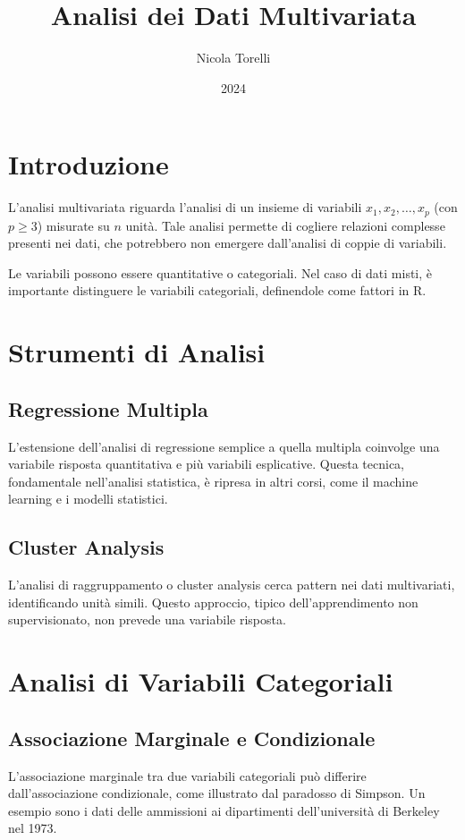 \documentclass{article}
\title{Analisi dei Dati Multivariata}
\author{Nicola Torelli}
\date{2024}
\begin{document}
\maketitle

\section{Introduzione}
L'analisi multivariata riguarda l'analisi di un insieme di variabili \( x_1, x_2, \ldots, x_p \) (con \( p \geq 3 \)) misurate su \( n \) unità. Tale analisi permette di cogliere relazioni complesse presenti nei dati, che potrebbero non emergere dall'analisi di coppie di variabili.

Le variabili possono essere quantitative o categoriali. Nel caso di dati misti, è importante distinguere le variabili categoriali, definendole come fattori in R.

\section{Strumenti di Analisi}
\subsection{Regressione Multipla}
L'estensione dell'analisi di regressione semplice a quella multipla coinvolge una variabile risposta quantitativa e più variabili esplicative. Questa tecnica, fondamentale nell'analisi statistica, è ripresa in altri corsi, come il machine learning e i modelli statistici.

\subsection{Cluster Analysis}
L'analisi di raggruppamento o cluster analysis cerca pattern nei dati multivariati, identificando unità simili. Questo approccio, tipico dell'apprendimento non supervisionato, non prevede una variabile risposta.

\section{Analisi di Variabili Categoriali}
\subsection{Associazione Marginale e Condizionale}
L'associazione marginale tra due variabili categoriali può differire dall'associazione condizionale, come illustrato dal paradosso di Simpson. Un esempio sono i dati delle ammissioni ai dipartimenti dell'università di Berkeley nel 1973.
\end{document}
